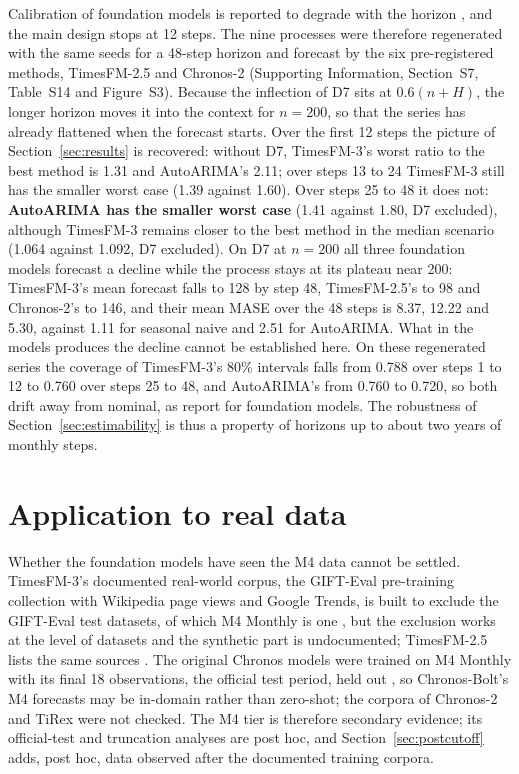 \documentclass[ASNA]{USG}
\providecommand{\sectionref}[1]{Section~\ref{#1}}
\begin{document}
Calibration of foundation models is reported to degrade with the horizon \citep{adler2026calibrated}, and the
main design stops at 12 steps. The nine processes were therefore regenerated with the same seeds for a
48-step horizon and forecast by the six pre-registered methods, TimesFM-2.5 and Chronos-2 (Supporting
Information, Section~S7, Table~S14 and Figure~S3). Because the inflection of D7 sits at $0.6(n + H)$, the
longer horizon moves it into the context for $n = 200$, so that the series has already flattened when the
forecast starts. Over the first 12 steps the picture of \sectionref{sec:results} is recovered: without D7,
TimesFM-3's worst ratio to the best method is 1.31 and AutoARIMA's 2.11; over steps 13 to 24 TimesFM-3 still
has the smaller worst case (1.39 against 1.60). Over steps 25 to 48 it does not: \textbf{AutoARIMA has the
smaller worst case} (1.41 against 1.80, D7 excluded), although TimesFM-3 remains closer to the best method in the median scenario
(1.064 against 1.092, D7 excluded). On D7 at $n = 200$ all three foundation models forecast a decline while the
process stays at its plateau near 200: TimesFM-3's mean forecast falls to 128 by step 48, TimesFM-2.5's to 98
and Chronos-2's to 146, and their mean MASE over the 48 steps is 8.37, 12.22 and 5.30, against 1.11 for
seasonal naive and 2.51 for AutoARIMA. What in the models produces the decline cannot be established here.
On these regenerated series the coverage of TimesFM-3's 80\% intervals falls from 0.788 over steps 1 to 12 to
0.760 over steps 25 to 48, and AutoARIMA's from 0.760 to 0.720, so both drift away from nominal, as
\citet{adler2026calibrated} report for foundation models. The robustness of \sectionref{sec:estimability} is
thus a property of horizons up to about two years of monthly steps.

\section{Application to real data}
\label{sec:realdata}

Whether the foundation models have seen the M4 data cannot be settled. TimesFM-3's documented real-world
corpus, the GIFT-Eval pre-training collection with Wikipedia page views and Google Trends, is built to
exclude the GIFT-Eval test datasets, of which M4 Monthly is one \citep{timesfm3card, aksu2024gifteval,
giftevalpretrain}, but the exclusion works at the level of datasets and the synthetic part is undocumented;
TimesFM-2.5 lists the same sources \citep{timesfm25card}. The original Chronos models were trained on M4
Monthly with its final 18 observations, the official test period, held out \citep[Table~2]{ansari2024chronos},
so Chronos-Bolt's M4 forecasts may be in-domain rather than zero-shot; the corpora of Chronos-2 and TiRex were
not checked. The M4 tier is therefore secondary evidence; its official-test and truncation analyses are post hoc, and
\sectionref{sec:postcutoff} adds, post hoc, data observed after the documented training corpora.
\end{document}
